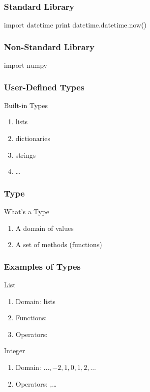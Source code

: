 \begin{frame}[fragile]
\frametitle{Standard Library}
\begin{python}
import datetime
print datetime.datetime.now()
\end{python}
\end{frame}

\begin{frame}[fragile]
\frametitle{Non-Standard Library}
\begin{python}
import numpy
\end{python}
\end{frame}

\begin{frame}[fragile]
\frametitle{User-Defined Types}

\begin{block}{Built-in Types}
\begin{enumerate}
\item lists
\item dictionaries
\item strings
\item \ldots
\end{enumerate}
\end{block}
\end{frame}

\begin{frame}[fragile]
\frametitle{Type}
\begin{block}{What's a Type}
\begin{enumerate}
\item A domain of values
\item A set of methods (functions)
\end{enumerate}
\end{block}

\end{frame}

\begin{frame}[fragile]
\frametitle{Examples of Types}

\begin{block}{List}
\begin{enumerate}
\item Domain: lists
\item Functions: 
\item Operators: 
\end{enumerate}
\end{block}

\pause
\begin{block}{Integer}
\begin{enumerate}
\item Domain: $\dots,-2, 1, 0, 1, 2, \dots$
\item Operators: ,\ldots
\end{enumerate}
\end{block}
\end{frame}

